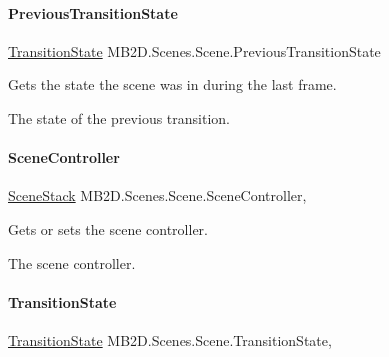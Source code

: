 \paragraph{\texorpdfstring{Previous\+Transition\+State}{PreviousTransitionState}}
{\footnotesize\ttfamily \hyperlink{namespace_m_b2_d_1_1_scenes_a0e0db3f97bbaa272f70534c5954c4acc}{Transition\+State} M\+B2\+D.\+Scenes.\+Scene.\+Previous\+Transition\+State\hspace{0.3cm}{\ttfamily [get]}}



Gets the state the scene was in during the last frame. 

The state of the previous transition.\hypertarget{class_m_b2_d_1_1_scenes_1_1_scene_ad32d9d738f33bd710184f7eda6a43ddf}{}\label{class_m_b2_d_1_1_scenes_1_1_scene_ad32d9d738f33bd710184f7eda6a43ddf} 
\paragraph{\texorpdfstring{Scene\+Controller}{SceneController}}
{\footnotesize\ttfamily \hyperlink{class_m_b2_d_1_1_scenes_1_1_scene_stack}{Scene\+Stack} M\+B2\+D.\+Scenes.\+Scene.\+Scene\+Controller\hspace{0.3cm}{\ttfamily [get]}, {\ttfamily [set]}}



Gets or sets the scene controller. 

The scene controller.\hypertarget{class_m_b2_d_1_1_scenes_1_1_scene_a6167906306d4c7d9a7a4fbd6909c9d12}{}\label{class_m_b2_d_1_1_scenes_1_1_scene_a6167906306d4c7d9a7a4fbd6909c9d12} 
\paragraph{\texorpdfstring{Transition\+State}{TransitionState}}
{\footnotesize\ttfamily \hyperlink{namespace_m_b2_d_1_1_scenes_a0e0db3f97bbaa272f70534c5954c4acc}{Transition\+State} M\+B2\+D.\+Scenes.\+Scene.\+Transition\+State\hspace{0.3cm}{\ttfamily [get]}, {\ttfamily [set]}}



